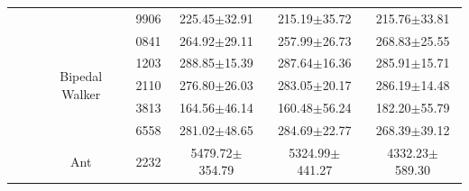 \begin{table}[t]
\begin{tabular}{ccccccc}
                             &                       &                                 & 9906        & 225.45$\pm$32.91                                                               & 215.19$\pm$35.72                                                           & 215.76$\pm$33.81                                                           \\ 
        \cline{3-7}
                             &                       & \multirow{5}{*}{Bipedal Walker} & 0841        & 264.92$\pm$29.11                                                               & 257.99$\pm$26.73                                                           & 268.83$\pm$25.55                                                           \\
                             &                       &                                 & 1203        & 288.85$\pm$15.39                                                               & 287.64$\pm$16.36                                                           & 285.91$\pm$15.71                                                           \\
                             &                       &                                 & 2110        & 276.80$\pm$26.03                                                               & 283.05$\pm$20.17                                                           & 286.19$\pm$14.48                                                           \\
                             &                       &                                 & 3813        & 164.56$\pm$46.14                                                               & 160.48$\pm$56.24                                                           & 182.20$\pm$55.79                                                           \\
                             &                       &                                 & 6558        & 281.02$\pm$48.65                                                               & 284.69$\pm$22.77                                                           & 268.39$\pm$39.12                                                           \\ 
        \cline{3-7}
                             &                       & \multirow{5}{*}{Ant}            & 2232        & 5479.72$\pm$354.79                                                             & 5324.99$\pm$441.27                                                         & 4332.23$\pm$589.30                                                         \\

\end{tabular}
\end{table}
